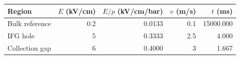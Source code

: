 \begin{tabular}{lrrrr}
\toprule
Region & $E$ (kV/cm) & $E/p$ (kV/cm/bar) & $v$ (m/s) & $t$ (ms) \\
\midrule
Bulk reference & 0.2 & 0.0133 & 0.1 & 15000.000 \\
IFG hole & 5 & 0.3333 & 2.5 & 4.000 \\
Collection gap & 6 & 0.4000 & 3 & 1.667 \\
\bottomrule
\end{tabular}

